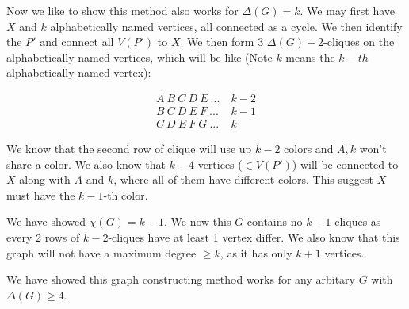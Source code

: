 \documentclass[11pt]{article}
\begin{document}
Now we like to show this method also works for $\Delta(G) = k$. We may first have $X$ and $k$ alphabetically named vertices, all connected as a cycle. We then identify the $P'$ and connect all $V(P')$ to $X$. We then form 3 $\Delta(G) - 2$-cliques on the alphabetically named vertices, which will be like (Note $k$ means the $k-th$ alphabetically named vertex):

\begin{align*}
    A \ B \ C \ D \ E \ ... \ &k - 2\\
    B \ C \ D \ E \ F \ ... \ &k - 1 \\
    C \ D \ E \ F \ G \ ... \ &k
\end{align*}

We know that the second row of clique will use up $k - 2$ colors and $A, k$ won't share a color. We also know that $k - 4$ vertices ($\in V(P')$) will be connected to $X$ along with $A$ and $k$, where all of them have different colors. This suggest $X$ must have the $k-1$-th color.\newline

We have showed $\chi(G) = k-1$. We now this $G$ contains no $k-1$ cliques as every 2 rows of $k-2$-cliques have at least 1 vertex differ. We also know that this graph will not have a maximum degree $\geq k$, as it has only $k+1$ vertices.

We have showed this graph constructing method works for any arbitary $G$ with $\Delta(G) \geq 4$.

%
% 
% 
\end{document}
